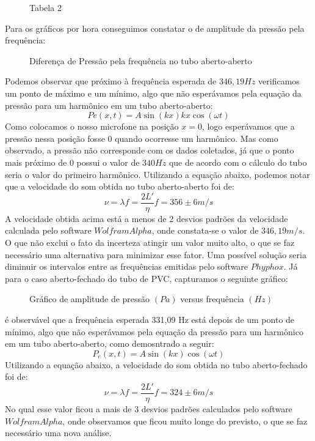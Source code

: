 \documentclass[a4paper]{report}
\begin{document}
\begin{figure}[!htb]
    \centering
    \caption{Tabela 2}
    \label{fig:Figura 1}
\end{figure}
\qquad Para os gráficos por hora conseguimos constatar o de amplitude da pressão pela frequência:
\begin{figure}[!htb]
    \centering
    \caption{Diferença de Pressão pela frequência no tubo aberto-aberto}
    \label{fig:Figura 1}
\end{figure}
\qquad Podemos observar que próximo à frequência esperada de $346,19 Hz$ verificamos um ponto de máximo e um mínimo, algo que não esperávamos pela equação da pressão para um harmônico em um tubo aberto-aberto:
\begin{equation}
    Pe(x,t) = A \sin{(kx)}kx\cos{(\omega t)}
\end{equation}
\qquad Como colocamos o nosso microfone na posição $x = 0$, logo esperávamos que a pressão nessa posição fosse 0 quando ocorresse um harmônico. Mas como observado, a pressão não corresponde com os dados coletados, já que o ponto mais próximo de 0 possui o valor de $340 Hz$ que de acordo com o cálculo do tubo seria o valor do primeiro harmônico.
Utilizando a equação abaixo, podemos notar que a velocidade do som obtida no tubo aberto-aberto foi de: 
\begin{equation}
    \nu = \lambda f = \frac{2 L'}{\eta} f = 356 \pm 6 m/s
\end{equation}
\qquad A velocidade obtida acima está a menos de 2 desvios padrões da velocidade calculada pelo software $Wolfram Alpha$, onde constata-se o valor de $346,19 m/s$. O que não exclui o fato da incerteza atingir um valor muito alto, o que se faz necessário uma alternativa para minimizar esse fator. Uma possível solução seria diminuir os intervalos entre as frequências emitidas pelo software $Phyphox$.
Já para o caso aberto-fechado do tubo de PVC, capturamos o seguinte gráfico: 
\begin{figure}[!htb]
    \centering
    \caption{Gráfico de amplitude de pressão $(Pa)$ versus frequência $(Hz)$ }
    \label{fig:enter-label}
\end{figure}
é observável que a frequência esperada 331,09 Hz está depois de um ponto de mínimo, algo que não esperávamos pela equação da pressão para um harmônico em um tubo aberto-aberto, como demosntrado a seguir:
\begin{equation}
    P_e(x,t) = A \sin{(kx)}\cos{(\omega t)}
\end{equation}
\qquad Utilizando a equação abaixo, a velocidade do som obtida no tubo aberto-fechado foi de: 
\begin{equation}
    \nu = \lambda f = \frac{2 L'}{\eta} f = 324 \pm 6 m/s
\end{equation}
\qquad No qual esse valor ficou a mais de 3 desvios padrões calculados pelo software $Wolfram Alpha$, onde observamos que ficou muito longe do previsto, o que se faz necessário uma nova análise.
\end{document}
